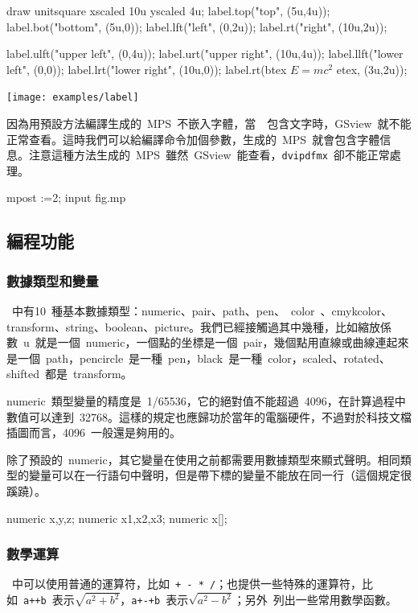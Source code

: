 \begin{code}
draw unitsquare xscaled 10u yscaled 4u;
label.top("top", (5u,4u));
label.bot("bottom", (5u,0));
label.lft("left", (0,2u));
label.rt("right", (10u,2u));
\end{code}
\begin{code}
label.ulft("upper left", (0,4u));
label.urt("upper right", (10u,4u));
label.llft("lower left", (0,0));
label.lrt("lower right", (10u,0));
label.rt(btex $E=mc^2$ etex, (3u,2u));
\end{code}

\begin{out}
\texttt{[image: examples/label]}
\end{out}

因為用預設方法編譯生成的~MPS~不嵌入字體，當~\MP~包含文字時，GSview~就不能正常查看。這時我們可以給編譯命令加個參數，生成的~MPS~就會包含字體信息。注意這種方法生成的~MPS~雖然~GSview~能查看，\verb|dvipdfmx|~卻不能正常處理。

\begin{code}
mpost \prologues:=2; input fig.mp
\end{code}

\subsection{編程功能}

\subsubsection{數據類型和變量}
\MP~中有10~種基本數據類型：numeric、pair、path、pen、~color~、cmykcolor、transform、string、boolean、picture。我們已經接觸過其中幾種，比如縮放係數~u~就是一個~numeric，一個點的坐標是一個~pair，幾個點用直線或曲線連起來是一個~path，pencircle~是一種~pen，black~是一種~color，scaled、rotated、shifted~都是~transform。

numeric~類型變量的精度是~1/65536，它的絕對值不能超過~4096，在計算過程中數值可以達到~32768。這樣的規定也應歸功於當年的電腦硬件，不過對於科技文檔插圖而言，4096~一般還是夠用的。

除了預設的~numeric，其它變量在使用之前都需要用數據類型來顯式聲明。相同類型的變量可以在一行語句中聲明，但是帶下標的變量不能放在同一行（這個規定很蹊蹺）。
\begin{code}
numeric x,y,z;    %
numeric x1,x2,x3; %
numeric x[];      %
\end{code}

\subsubsection{數學運算}
\MP~中可以使用普通的運算符，比如~\verb|+ - * /|；也提供一些特殊的運算符，比如~\verb|a++b|~表示$\sqrt{a^2+b^2}$，\verb|a+-+b|~表示$\sqrt{a^2-b^2}$；另外~列出一些常用數學函數。

